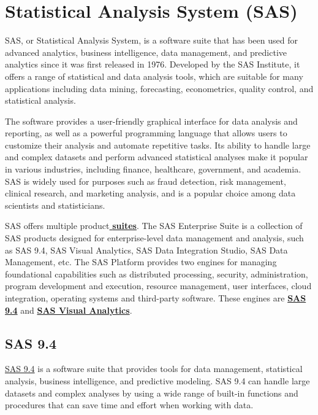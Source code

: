 \section{Statistical Analysis System (SAS)} \label{section: SAS}
SAS, or Statistical Analysis System, is a software suite that has been used for advanced analytics, business intelligence, data management, and predictive analytics since it was first released in 1976. Developed by the SAS Institute, it offers a range of statistical and data analysis tools, which are suitable for many applications including data mining, forecasting, econometrics, quality control, and statistical analysis.

The software provides a user-friendly graphical interface for data analysis and reporting, as well as a powerful programming language that allows users to customize their analysis and automate repetitive tasks. Its ability to handle large and complex datasets and perform advanced statistical analyses make it popular in various industries, including finance, healthcare, government, and academia. SAS is widely used for purposes such as fraud detection, risk management, clinical research, and marketing analysis, and is a popular choice among data scientists and statisticians. 

SAS offers multiple product\href{https://www.sas.com/en_us/software/all-products.html#all-products-a-z}{\textbf{ suites}}. The SAS Enterprise Suite is a collection of SAS products designed for enterprise-level data management and analysis, such as SAS 9.4, SAS Visual Analytics, SAS Data Integration Studio, SAS Data Management, etc. The SAS Platform provides two engines for managing foundational capabilities such as distributed processing, security, administration, program development and execution, resource management, user interfaces, cloud integration, operating systems and third-party software. These engines are \href{https://documentation.sas.com/doc/en/pgmsascdc/9.4_3.5/whatsnew/n17cszme3e52b4n1ooe3710fnuec.htm#:~:text=Initial%20Release%20of%20SAS%209.4,-The%20initial%20release&text=For%20SAS%20administrators%2C%20SAS%209.4,more%20complete%20data%20management%20solution.}{\textbf{SAS 9.4}} and \href{https://documentation.sas.com/doc/en/pgmsascdc/9.4_3.5/pgmsasgswlcm/home.htm}{\textbf{SAS Visual Analytics}}. 

\subsection{SAS 9.4}
\href{https://documentation.sas.com/doc/en/pgmsascdc/9.4_3.5/whatsnew/n17cszme3e52b4n1ooe3710fnuec.htm#:~:text=For%20SAS%20administrators%2C%20SAS%209.4,more%20complete%20data%20management%20solution.}{SAS 9.4} is a software suite that provides tools for data management, statistical analysis, business intelligence, and predictive modeling. SAS 9.4 can handle large datasets and complex analyses by using a wide range of built-in functions and procedures that can save time and effort when working with data. 

